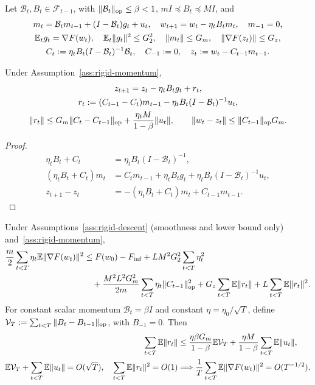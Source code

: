 \begin{assumption}\label{ass:rigid-momentum}
Let $\mathcal B_t,B_t\in\mathcal F_{t-1}$, with
$\|\mathcal B_t\|_{\mathrm{op}}\le\beta<1$, $mI\preceq B_t\preceq MI$, and
\begin{gather}
 m_t=\mathcal B_t m_{t-1}+(I-\mathcal B_t)g_t+u_t,\quad
 w_{t+1}=w_t-\eta_tB_tm_t,\quad m_{-1}=0,\\
 \mathbb E_tg_t=\nabla F(w_t),\quad\mathbb E_t\|g_t\|^2\le G_2^2,\quad
 \|m_t\|\le G_m,\quad\|\nabla F(z_t)\|\le G_z,\\
 C_t:=\eta_tB_t(I-\mathcal B_t)^{-1}\mathcal B_t,\quad C_{-1}:=0,\quad
 z_t:=w_t-C_{t-1}m_{t-1}.
\end{gather}
\end{assumption}
\begin{lemma}\label{lem:rigid-virtual}
Under Assumption~\ref{ass:rigid-momentum},
\begin{gather}
 z_{t+1}=z_t-\eta_tB_tg_t+r_t,\\
 r_t:=(C_{t-1}-C_t)m_{t-1}-\eta_tB_t(I-\mathcal B_t)^{-1}u_t,\\
 \|r_t\|\le G_m\|C_t-C_{t-1}\|_{\mathrm{op}}
                      +\frac{\eta_tM}{1-\beta}\|u_t\|,\qquad
 \|w_t-z_t\|\le\|C_{t-1}\|_{\mathrm{op}}G_m.
\end{gather}
\end{lemma}
\begin{proof}
\begin{align}
 \eta_tB_t+C_t&=\eta_tB_t(I-\mathcal B_t)^{-1},\\
 (\eta_tB_t+C_t)m_t
 &=C_tm_{t-1}+\eta_tB_tg_t
                       +\eta_tB_t(I-\mathcal B_t)^{-1}u_t,\\
 z_{t+1}-z_t&=-(\eta_tB_t+C_t)m_t+C_{t-1}m_{t-1}.
\end{align}
\end{proof}
\begin{theorem}
\label{thm:rigid-momentum}
Under Assumptions~\ref{ass:rigid-descent} (smoothness and lower bound only)
and~\ref{ass:rigid-momentum},
\begin{align}
 \frac m2\sum_{t<T}\eta_t\mathbb E\|\nabla F(w_t)\|^2
 &\le F(w_0)-F_{\inf}+LM^2G_2^2\sum_{t<T}\eta_t^2\\
 &\quad+\frac{M^2L^2G_m^2}{2m}\sum_{t<T}\eta_t\|C_{t-1}\|_{\mathrm{op}}^2
       +G_z\sum_{t<T}\mathbb E\|r_t\|+L\sum_{t<T}\mathbb E\|r_t\|^2.
\end{align}
For constant scalar momentum $\mathcal B_t=\beta I$ and constant
$\eta=\eta_0/\sqrt T$, define
$\mathcal V_T:=\sum_{t<T}\|B_t-B_{t-1}\|_{\mathrm{op}}$, with $B_{-1}=0$. Then
\begin{align}
 \sum_{t<T}\mathbb E\|r_t\|
 &\le\frac{\eta\beta G_m}{1-\beta}\mathbb E\mathcal V_T
                  +\frac{\eta M}{1-\beta}\sum_{t<T}\mathbb E\|u_t\|,\\
 \mathbb E\mathcal V_T+\sum_{t<T}\mathbb E\|u_t\|=O(\sqrt T),\quad
 \sum_{t<T}\mathbb E\|r_t\|^2=O(1)
 &\Longrightarrow\frac1T\sum_{t<T}\mathbb E\|\nabla F(w_t)\|^2=O(T^{-1/2}).
\end{align}
\end{theorem}
